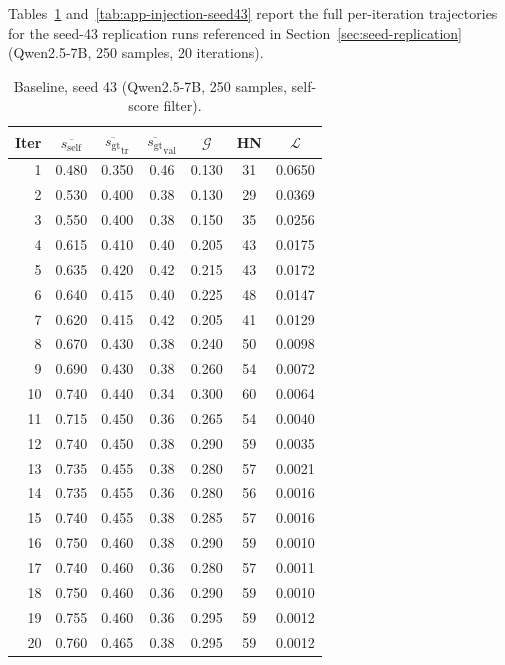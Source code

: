 \documentclass{article}
\newcommand{\gap}{\mathcal{G}}          %
\newcommand{\self}{s_{\text{self}}}     %
\newcommand{\gt}{s_{\text{gt}}}         %
\begin{document}
Tables~\ref{tab:app-baseline-seed43} and~\ref{tab:app-injection-seed43} report
the full per-iteration trajectories for the seed-43 replication runs referenced
in Section~\ref{sec:seed-replication} (Qwen2.5-7B, 250 samples, 20 iterations).

\begin{table}[h]
\centering
\caption{Baseline, seed 43 (Qwen2.5-7B, 250 samples, self-score filter).}
\label{tab:app-baseline-seed43}
\small
\begin{tabular}{rcccccc}
\toprule
Iter & $\overline{\self}$ & $\overline{\gt}_\text{tr}$ & $\overline{\gt}_\text{val}$ & $\gap$ & HN & $\mathcal{L}$ \\
\midrule
1  & 0.480 & 0.350 & 0.46 & 0.130 & 31 & 0.0650 \\
2  & 0.530 & 0.400 & 0.38 & 0.130 & 29 & 0.0369 \\
3  & 0.550 & 0.400 & 0.38 & 0.150 & 35 & 0.0256 \\
4  & 0.615 & 0.410 & 0.40 & 0.205 & 43 & 0.0175 \\
5  & 0.635 & 0.420 & 0.42 & 0.215 & 43 & 0.0172 \\
6  & 0.640 & 0.415 & 0.40 & 0.225 & 48 & 0.0147 \\
7  & 0.620 & 0.415 & 0.42 & 0.205 & 41 & 0.0129 \\
8  & 0.670 & 0.430 & 0.38 & 0.240 & 50 & 0.0098 \\
9  & 0.690 & 0.430 & 0.38 & 0.260 & 54 & 0.0072 \\
10 & 0.740 & 0.440 & 0.34 & 0.300 & 60 & 0.0064 \\
11 & 0.715 & 0.450 & 0.36 & 0.265 & 54 & 0.0040 \\
12 & 0.740 & 0.450 & 0.38 & 0.290 & 59 & 0.0035 \\
13 & 0.735 & 0.455 & 0.38 & 0.280 & 57 & 0.0021 \\
14 & 0.735 & 0.455 & 0.36 & 0.280 & 56 & 0.0016 \\
15 & 0.740 & 0.455 & 0.38 & 0.285 & 57 & 0.0016 \\
16 & 0.750 & 0.460 & 0.38 & 0.290 & 59 & 0.0010 \\
17 & 0.740 & 0.460 & 0.36 & 0.280 & 57 & 0.0011 \\
18 & 0.750 & 0.460 & 0.36 & 0.290 & 59 & 0.0010 \\
19 & 0.755 & 0.460 & 0.36 & 0.295 & 59 & 0.0012 \\
20 & 0.760 & 0.465 & 0.38 & 0.295 & 59 & 0.0012 \\
\bottomrule
\end{tabular}
\end{table}
\end{document}
